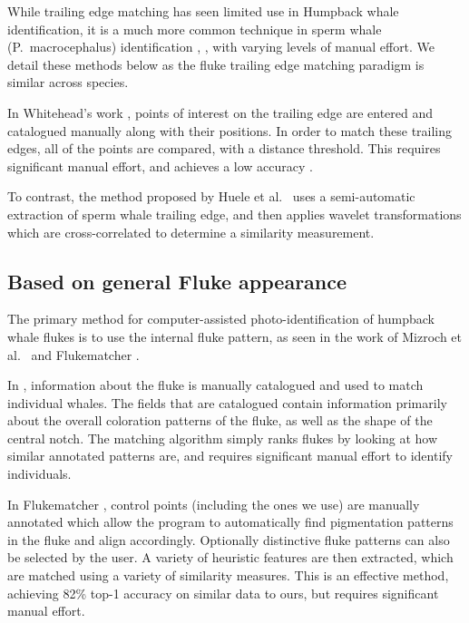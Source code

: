 While trailing edge matching has seen limited use in Humpback whale identification, it is a much more common technique in sperm whale (P.\ macrocephalus) identification \cite{huele2000finding}, \cite{beekmans2005comparison} \cite{whitehead1990computer}, with varying levels of manual effort.
We detail these methods below as the fluke trailing edge matching paradigm is similar across species.

In Whitehead's work \cite{whitehead1990computer}, points of interest on the trailing edge are entered and catalogued manually along with their positions.
In order to match these trailing edges, all of the points are compared, with a distance threshold.
This requires significant manual effort, and achieves a low accuracy \cite{beekmans2005comparison}.

To contrast, the method proposed by Huele et al.\ \cite{huele2000finding} uses a semi-automatic extraction of sperm whale trailing edge, and then applies wavelet transformations which are cross-correlated to determine a similarity measurement.

\subsection{Based on general Fluke appearance}


The primary method for computer-assisted photo-identification of humpback whale flukes is to use the internal fluke pattern, as seen in the work of Mizroch et al.\ \cite{mizroch1990computer} and Flukematcher \cite{kniest2010fluke}. 

In \cite{mizroch1990computer}, information about the fluke is manually catalogued and used to match individual whales. 
The fields that are catalogued contain information primarily about the overall coloration patterns of the fluke, as well as the shape of the central notch. 
The matching algorithm simply ranks flukes by looking at how similar annotated patterns are, and requires significant manual effort to identify individuals.

In Flukematcher \cite{kniest2010fluke}, control points (including the ones we use) are manually annotated which allow the program to automatically find pigmentation patterns in the fluke and align accordingly.
Optionally distinctive fluke patterns can also be selected by the user.
A variety of heuristic features are then extracted, which are matched using a variety of similarity measures.
This is an effective method, achieving 82\% top-1 accuracy on similar data to ours, but requires significant manual effort.

